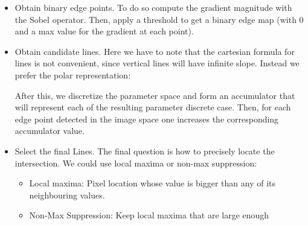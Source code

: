 \begin{itemize}
\item Obtain binary edge points. To do so compute the gradient magnitude with the Sobel operator. Then, apply a threshold to get a binary edge map (with 0 and a max value for the gradient at each point).
\item Obtain candidate lines. Here we have to note that the cartesian formula for lines is not convenient, since vertical lines will have infinite slope. Instead we prefer the polar representation:

\begin{figure}[H]
\centering
{}
\end{figure}

After this, we discretize the parameter space and form an accumulator that will represent each of the resulting parameter discrete case. Then, for each edge point detected in the image space one increases the corresponding accumulator value.

\item Select the final Lines. The final question is how to precisely locate the intersection. We could use local maxima or non-max suppression:

\begin{itemize}
\item Local maxima: Pixel location whose value is bigger than any of its neighbouring values.
\item Non-Max Suppression: Keep local maxima that are large enough
\end{itemize}
\end{itemize}

